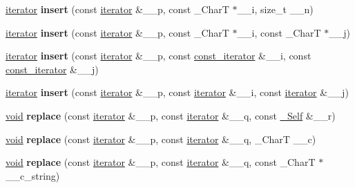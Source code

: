 \begin{DoxyCompactItemize}
\mbox{\label{classrope_a255568827cf8ce92a79da3921cb25525}} 
\hyperlink{class___rope__iterator}{iterator} {\bfseries insert} (const \hyperlink{class___rope__iterator}{iterator} \&\+\_\+\+\_\+p, const \+\_\+\+CharT $\ast$\+\_\+\+\_\+i, size\+\_\+t \+\_\+\+\_\+n)
\item 
\mbox{\label{classrope_aedeecc9fcc9d38fffe590024fc4862b6}} 
\hyperlink{class___rope__iterator}{iterator} {\bfseries insert} (const \hyperlink{class___rope__iterator}{iterator} \&\+\_\+\+\_\+p, const \+\_\+\+CharT $\ast$\+\_\+\+\_\+i, const \+\_\+\+CharT $\ast$\+\_\+\+\_\+j)
\item 
\mbox{\label{classrope_aed324ebd610ca2abf33eaf003e0e3a0b}} 
\hyperlink{class___rope__iterator}{iterator} {\bfseries insert} (const \hyperlink{class___rope__iterator}{iterator} \&\+\_\+\+\_\+p, const \hyperlink{class___rope__const__iterator}{const\+\_\+iterator} \&\+\_\+\+\_\+i, const \hyperlink{class___rope__const__iterator}{const\+\_\+iterator} \&\+\_\+\+\_\+j)
\item 
\mbox{\label{classrope_a70d0bc482a14d1546c05cdcf19dac536}} 
\hyperlink{class___rope__iterator}{iterator} {\bfseries insert} (const \hyperlink{class___rope__iterator}{iterator} \&\+\_\+\+\_\+p, const \hyperlink{class___rope__iterator}{iterator} \&\+\_\+\+\_\+i, const \hyperlink{class___rope__iterator}{iterator} \&\+\_\+\+\_\+j)
\item 
\mbox{\label{classrope_a5a11e5c0388cf20ee52cf5be53de8848}} 
\hyperlink{interfacevoid}{void} {\bfseries replace} (const \hyperlink{class___rope__iterator}{iterator} \&\+\_\+\+\_\+p, const \hyperlink{class___rope__iterator}{iterator} \&\+\_\+\+\_\+q, const \hyperlink{classrope}{\+\_\+\+Self} \&\+\_\+\+\_\+r)
\item 
\mbox{\label{classrope_ac0fa1d5a44cf6d5c9fa760618e18a0e3}} 
\hyperlink{interfacevoid}{void} {\bfseries replace} (const \hyperlink{class___rope__iterator}{iterator} \&\+\_\+\+\_\+p, const \hyperlink{class___rope__iterator}{iterator} \&\+\_\+\+\_\+q, \+\_\+\+CharT \+\_\+\+\_\+c)
\item 
\mbox{\label{classrope_ac225c576f69a992a8fa4e5f5bdf54d7b}} 
\hyperlink{interfacevoid}{void} {\bfseries replace} (const \hyperlink{class___rope__iterator}{iterator} \&\+\_\+\+\_\+p, const \hyperlink{class___rope__iterator}{iterator} \&\+\_\+\+\_\+q, const \+\_\+\+CharT $\ast$\+\_\+\+\_\+c\+\_\+string)

\end{DoxyCompactItemize}
